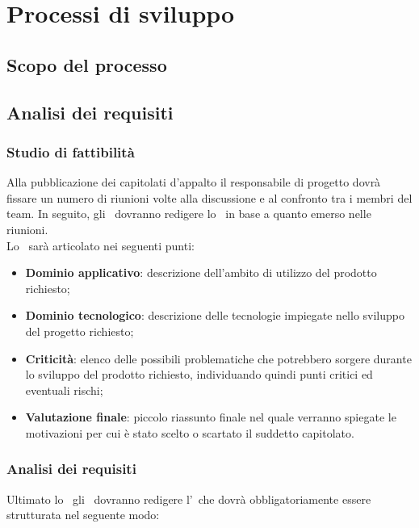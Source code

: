 \documentclass[../NormeDiProgetto.tex]{subfiles}
\begin{document}
\section{Processi di sviluppo}

   \subsection{Scopo del processo}
      \subsection{Analisi dei requisiti}
            \subsubsection{Studio di fattibilità}
            Alla pubblicazione dei capitolati d'appalto il responsabile di progetto dovrà fissare un numero di riunioni volte alla discussione e al confronto tra i membri del team. In seguito, gli \analisti\ dovranno redigere lo \studiodifattibilita\ in base a quanto emerso nelle riunioni. \\ Lo  \studiodifattibilita\ sarà articolato nei seguenti punti:
            \begin{itemize}
                  \item \textbf{Dominio applicativo}: descrizione dell'ambito di utilizzo del prodotto richiesto;
                  \item \textbf{Dominio tecnologico}: descrizione delle tecnologie impiegate nello sviluppo del progetto richiesto;
                  \item \textbf{Criticità}: elenco delle possibili problematiche che potrebbero sorgere durante lo sviluppo del prodotto richiesto, individuando quindi punti critici ed eventuali rischi;
                  \item \textbf{Valutazione finale}: piccolo riassunto finale nel quale verranno spiegate le motivazioni per cui è stato scelto o scartato il suddetto capitolato.
            \end{itemize}

            \subsubsection{Analisi dei requisiti}
            Ultimato lo \studiodifattibilita\ gli \analisti\ dovranno redigere l'\analisideirequisiti\ che dovrà obbligatoriamente essere strutturata nel seguente modo:
                  
\end{document}
